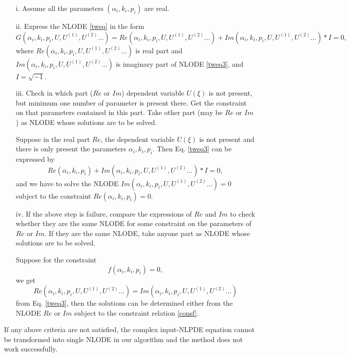 \documentclass[prd,aps,floats,showkeys,nofootinbib,notitlepage]{revtex4}
\begin{document}
	\begin{itemize}
		\item[i.] Assume all the parameters $(\alpha_i,k_i,p_i)$ are real.
		\item[ii.] Express the NLODE \eqref{tweq} in the form 
		\begin{equation}\label{tweq3}
			G\left( {\alpha_i,k_i,p_i,U,U^{(1)},U^{(2)}} \ldots \right) = Re\left( {\alpha_i,k_i,p_i,U,U^{(1)},U^{(2)}} \ldots \right)+Im\left( {\alpha_i,k_i,p_i,U,U^{(1)},U^{(2)}} \ldots \right)*I=0,
		\end{equation}
		where $Re\left( {\alpha_i,k_i,p_i,U,U^{(1)},U^{(2)}} \ldots \right)$ is real part and $Im\left( {\alpha_i,k_i,p_i,U,U^{(1)},U^{(2)}} \ldots \right)$ is imaginary part of NLODE \eqref{tweq3}, and $I=\sqrt{-1}$.
		\item[iii.] Check in which part ($Re$ or $Im$) dependent variable $U(\xi)$ is not present, but minimum one number of parameter is present there. Get the constraint on that parameters contained in this part. Take other part (may be $Re$ or $Im$) as NLODE whose solutions are to be solved. 
		\par Suppose in the real part $Re$, the dependent variable $U(\xi)$ is not present and there is only present the parameters $\alpha_i,k_i,p_i$. Then Eq. \eqref{tweq3} can be expressed by 
		\begin{equation}
			Re\left( {\alpha_i,k_i,p_i} \right)+Im\left( {\alpha_i,k_i,p_i,U,U^{(1)},U^{(2)}} \ldots \right)*I=0,
		\end{equation}
		and we have to solve the NLODE $Im\left( {\alpha_i,k_i,p_i,U,U^{(1)},U^{(2)}} \ldots \right)=0$ subject to the constraint $Re\left( {\alpha_i,k_i,p_i}\right)=0$.
		\item[iv.] If the above step is failure, compare the expressions of $Re$ and $Im$ to check whether they are the same NLODE for some constraint on the parameters of $Re$ or $Im$. If they are the same NLODE, take anyone part as NLODE whose solutions are to be solved.
		\par Suppose for the constraint 
		\begin{equation}\label{consf}
			f(\alpha_i,k_i,p_i)=0,
		\end{equation}
		we get
		\begin{equation}\label{reEqIm}
			Re\left( {\alpha_i,k_i,p_i,U,U^{(1)},U^{(2)}} \ldots \right)=Im\left( {\alpha_i,k_i,p_i,U,U^{(1)},U^{(2)}} \ldots \right)
		\end{equation}
		from Eq. \eqref{tweq3}, then the solutions can be determined either from the NLODE $Re$ or $Im$ subject to the constraint relation \eqref{consf}. 
	\end{itemize}
	If any above criteria are not satisfied, the complex input-NLPDE equation cannot be transformed into single NLODE in our algorithm and the method does not work
	successfully.\\
	
\end{document}

